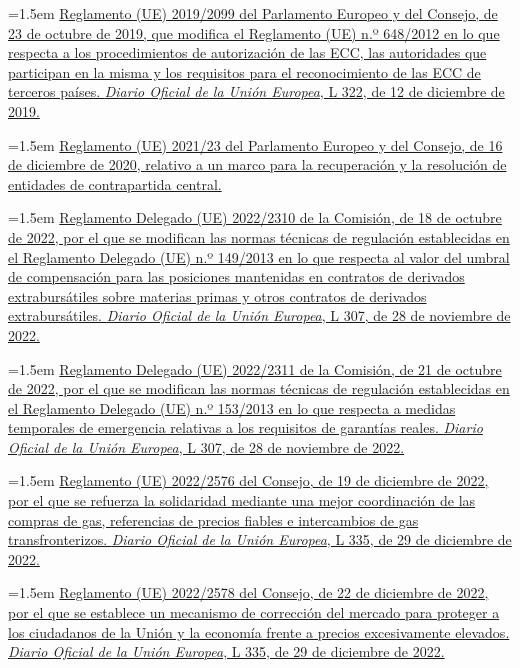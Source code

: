 \documentclass[10pt,a4paper]{article}
\begin{document}
\noindent\hangindent=1.5em \href{https://eur-lex.europa.eu/eli/reg/2019/2099/oj}{Reglamento (UE) 2019/2099 del Parlamento Europeo y del Consejo, de 23 de octubre de 2019, que modifica el Reglamento (UE) n.º 648/2012 en lo que respecta a los procedimientos de autorización de las ECC, las autoridades que participan en la misma y los requisitos para el reconocimiento de las ECC de terceros países. \textit{Diario Oficial de la Unión Europea}, L 322, de 12 de diciembre de 2019.}

\noindent\hangindent=1.5em \href{https://eur-lex.europa.eu/legal-content/ES/TXT/?uri=CELEX:32021R0023}{Reglamento (UE) 2021/23 del Parlamento Europeo y del Consejo, de 16 de diciembre de 2020, relativo a un marco para la recuperación y la resolución de entidades de contrapartida central.}

\noindent\hangindent=1.5em \href{https://eur-lex.europa.eu/eli/reg_del/2022/2310/oj}{Reglamento Delegado (UE) 2022/2310 de la Comisión, de 18 de octubre de 2022, por el que se modifican las normas técnicas de regulación establecidas en el Reglamento Delegado (UE) n.º 149/2013 en lo que respecta al valor del umbral de compensación para las posiciones mantenidas en contratos de derivados extrabursátiles sobre materias primas y otros contratos de derivados extrabursátiles. \textit{Diario Oficial de la Unión Europea}, L 307, de 28 de noviembre de 2022.}

\noindent\hangindent=1.5em \href{https://eur-lex.europa.eu/eli/reg_del/2022/2311/oj}{Reglamento Delegado (UE) 2022/2311 de la Comisión, de 21 de octubre de 2022, por el que se modifican las normas técnicas de regulación establecidas en el Reglamento Delegado (UE) n.º 153/2013 en lo que respecta a medidas temporales de emergencia relativas a los requisitos de garantías reales. \textit{Diario Oficial de la Unión Europea}, L 307, de 28 de noviembre de 2022.}

\noindent\hangindent=1.5em \href{https://eur-lex.europa.eu/eli/reg/2022/2576/oj}{Reglamento (UE) 2022/2576 del Consejo, de 19 de diciembre de 2022, por el que se refuerza la solidaridad mediante una mejor coordinación de las compras de gas, referencias de precios fiables e intercambios de gas transfronterizos. \textit{Diario Oficial de la Unión Europea}, L 335, de 29 de diciembre de 2022.}

\noindent\hangindent=1.5em \href{https://eur-lex.europa.eu/eli/reg/2022/2578/oj}{Reglamento (UE) 2022/2578 del Consejo, de 22 de diciembre de 2022, por el que se establece un mecanismo de corrección del mercado para proteger a los ciudadanos de la Unión y la economía frente a precios excesivamente elevados. \textit{Diario Oficial de la Unión Europea}, L 335, de 29 de diciembre de 2022.}
\end{document}
